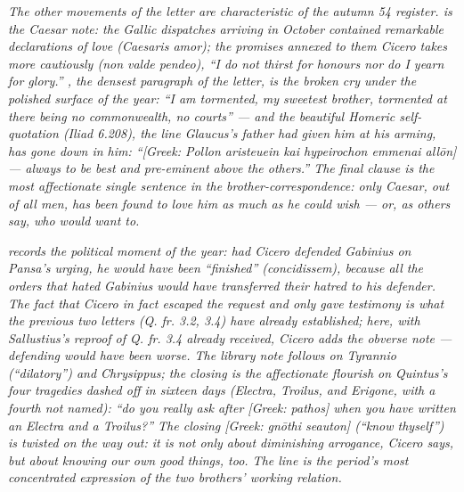 \textit{The other movements of the letter are characteristic
of the autumn 54 register.  is the Caesar note:
the Gallic dispatches arriving in October contained
remarkable declarations of love (\textit{Caesaris amor}); the
promises annexed to them Cicero takes more cautiously
(\textit{non valde pendeo}), ``I do not thirst for honours nor
do I yearn for glory.'' , the densest paragraph
of the letter, is the broken cry under the polished surface
of the year: ``I am tormented, my sweetest brother, tormented
at there being no commonwealth, no courts'' --- and the
beautiful Homeric self-quotation (Iliad 6.208), the line
Glaucus's father had given him at his arming, has gone down
in him: ``\textit{[Greek: Pollon aristeuein kai hypeirochon
emmenai all\=on]} --- always to be best and pre-eminent above
the others.'' The final clause is the most affectionate
single sentence in the brother-correspondence: only Caesar,
out of all men, has been found to love him as much as he
could wish --- or, as others say, who would want to.}

\textit{ records the political moment of the
year: had Cicero defended Gabinius on Pansa's urging, he would
have been ``finished'' (\textit{concidissem}), because all the
orders that hated Gabinius would have transferred their
hatred to his defender. The fact that Cicero in fact escaped
the request and only gave testimony is what the previous
two letters (Q. fr. 3.2, 3.4) have already established;
here, with Sallustius's reproof of \textit{Q. fr.} 3.4
already received, Cicero adds the obverse note --- defending
would have been worse. The library note follows on Tyrannio
(``dilatory'') and Chrysippus; the closing  is
the affectionate flourish on Quintus's four tragedies dashed
off in sixteen days (Electra, Troilus, and Erigone, with a
fourth not named): ``do you really ask after \textit{[Greek:
pathos]} when you have written an Electra and a Troilus?''
The closing \textit{[Greek: gn\=othi seauton]} (``know
thyself'') is twisted on the way out: it is not only about
diminishing arrogance, Cicero says, but about knowing our own
good things, too. The line is the period's most concentrated
expression of the two brothers' working relation.}
